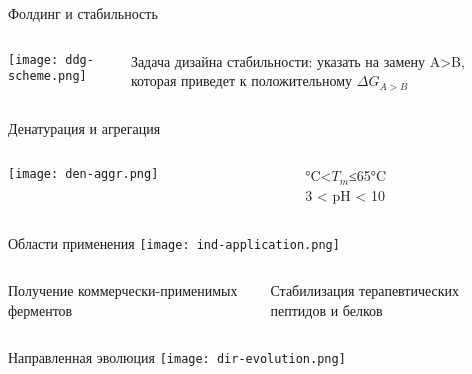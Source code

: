     
\begin{frame}[plain]
  \titlepage
\end{frame}


\begin{frame}{Фолдинг и стабильность}

\begin{columns}
\begin{column}{0.7\textwidth}
    \texttt{[image: ddg-scheme.png]}
\end{column}
\begin{column}{0.3\textwidth}
Задача дизайна стабильности: указать на замену A>B, которая приведет к положительному $\Delta G_{A>B} $
\end{column}
\end{columns}

\end{frame}

\begin{frame}{Денатурация и агрегация}
\begin{columns}
\begin{column}{0.7\textwidth}
    \texttt{[image: den-aggr.png]}
\end{column}
\begin{column}{0.3\textwidth}
    °C<$T_m$≤65°C \\ \vspace{2cm}3 < pH < 10
\end{column}
\end{columns}
\end{frame}

\begin{frame}{Области применения}
    \texttt{[image: ind-application.png]}
\begin{columns}
\begin{column}{0.5\textwidth}
Получение коммерчески-применимых ферментов 
\end{column}
\begin{column}{0.5\textwidth}
    Стабилизация терапевтических пептидов и белков
\end{column}
\end{columns}
\end{frame}

\begin{frame}{Направленная эволюция}
    \centering
    \texttt{[image: dir-evolution.png]}
\end{frame}

